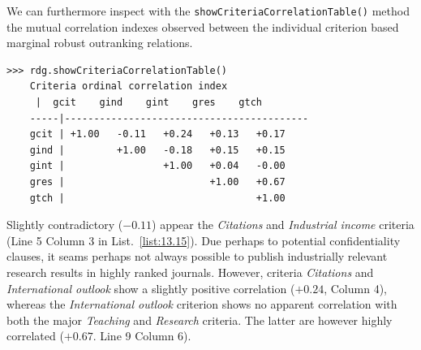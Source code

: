 We can furthermore inspect with the \texttt{showCriteriaCorrelationTable()} method  the mutual correlation indexes observed between the individual criterion based marginal robust outranking relations. 
\begin{lstlisting}[caption={Showing the ordinal correlation between the marginal criterion relations},label=list:13.15]
>>> rdg.showCriteriaCorrelationTable()
    Criteria ordinal correlation index
	 |  gcit    gind    gint    gres    gtch   
    -----|------------------------------------------
    gcit | +1.00   -0.11   +0.24   +0.13   +0.17   
    gind |         +1.00   -0.18   +0.15   +0.15   
    gint |                 +1.00   +0.04   -0.00   
    gres |                         +1.00   +0.67   
    gtch |                                 +1.00   
\end{lstlisting}

Slightly contradictory ($-0.11$) appear the \emph{Citations} and \emph{Industrial income} criteria (Line 5 Column 3 in List.~\vref{list:13.15}). Due perhaps to potential confidentiality clauses, it seams perhaps not always possible to publish industrially relevant research results in highly ranked journals. However, criteria \emph{Citations} and \emph{International outlook} show a slightly positive correlation ($+0.24$, Column 4), whereas the \emph{International outlook} criterion shows no apparent correlation with both the major \emph{Teaching} and \emph{Research} criteria. The latter are however highly correlated ($+0.67$. Line 9 Column 6).

